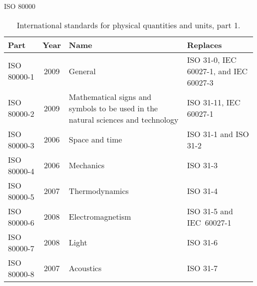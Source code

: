 \documentclass[xcolor=dvipsnames, aspectratio=169, handout, intlimits]{beamer}
\begin{document}
\begin{frame}{ISO 80000}

\vspace{-0.75cm}
\begin{table}
	\caption{International standards for physical quantities and units, part 1.}
	\begin{tabular}{lcp{66mm}p{37mm}}
		Part & Year & Name & Replaces \\ 
		\toprule
		ISO 80000-1 & 2009 & \small{\textcolor{elmagLight}{General}} & \small{ISO 31-0, IEC 60027-1, and IEC 60027-3} \\ 
		ISO 80000-2 & 2009 & \small{\textcolor{elmagLight}{Mathematical signs and symbols to be used \newline in the natural sciences and technology}} & \small{ISO 31-11, IEC 60027-1} \\ 
		ISO 80000-3 & 2006 & \small{\textcolor{elmagLight}{Space and time}} & \small{ISO 31-1 and ISO 31-2} \\ 
		ISO 80000-4 & 2006 & \small{Mechanics} & \small{ISO 31-3} \\ 
		ISO 80000-5 & 2007 & \small{Thermodynamics} & \small{ISO 31-4} \\ 
		ISO 80000-6 & 2008 & \small{\textcolor{elmagLight}{Electromagnetism}} & \small{ISO 31-5 and \mbox{IEC 60027-1}} \\ 
		ISO 80000-7 & 2008 & \small{Light} & \small{ISO 31-6} \\ 
		ISO 80000-8 & 2007 & \small{Acoustics} & \small{ISO 31-7} \\ 
		\bottomrule
	\end{tabular} 
\end{table}

\end{frame}
\end{document}
